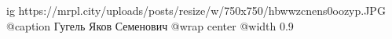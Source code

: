  
 
 
 
 

\ifcmt
  ig https://mrpl.city/uploads/posts/resize/w/750x750/hbwwzcnens0oozyp.JPG
	@caption Гугель Яков Семенович
  @wrap center
  @width 0.9
\fi
